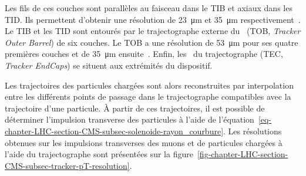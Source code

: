 Les fils de ces couches sont parallèles au faisceau dans le TIB et axiaux dans les TID.
Ils permettent d'obtenir une résolution de \SI{23}{\micro\meter} et \SI{35}{\micro\meter} respectivement~\cite{cms_paper}.
Le TIB et les TID sont entourés par le trajectographe externe du \CMSbarrel\ (TOB, \emph{Tracker Outer Barrel}) de six couches.
Le TOB a une résolution de \SI{53}{\micro\meter} pour ses quatre premières couches et de \SI{35}{\micro\meter} ensuite~\cite{cms_paper}.
Enfin, les \CMSendcaps\ du trajectographe (TEC, \emph{Tracker EndCaps}) se situent aux extrémités du dispositif.
\par Les trajectoires des particules chargées sont alors reconstruites par interpolation entre les différents points de passage dans le trajectographe compatibles avec la trajectoire d'une particule.
À partir de ces trajectoires, il est possible de déterminer l'impulsion transverse des particules à l'aide de l'équation~\eqref{eq-chapter-LHC-section-CMS-subsec-solenoide-rayon_courbure}.
Les résolutions obtenues sur les impulsions transverses des muons et de particules chargées à l'aide du trajectographe sont présentées sur la figure~\ref{fig-chapter-LHC-section-CMS-subsec-tracker-pT-resolution}.

